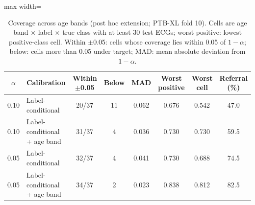\begin{table}[!htbp]
\centering\small
\caption{Coverage across age bands (post hoc extension; PTB-XL fold 10). Cells are age band $\times$ label $\times$ true class with at least 30 test ECGs; worst positive: lowest positive-class cell. Within $\pm$0.05: cells whose coverage lies within 0.05 of $1-\alpha$; below: cells more than 0.05 under target; MAD: mean absolute deviation from $1-\alpha$.}
\label{tab:age}
\setlength{\tabcolsep}{3pt}
\begin{adjustbox}{max width=\linewidth}
\begin{tabular}{clcccccc}
\toprule
$\alpha$ & Calibration & Within $\pm$0.05 & Below & MAD & Worst positive & Worst cell & Referral (\%) \\
\midrule
0.10 & Label-conditional & 20/37 & 11 & 0.062 & 0.676 & 0.542 & 47.0 \\
0.10 & Label-conditional + age band & 31/37 & 4 & 0.036 & 0.730 & 0.730 & 59.5 \\
0.05 & Label-conditional & 32/37 & 4 & 0.041 & 0.730 & 0.688 & 74.5 \\
0.05 & Label-conditional + age band & 34/37 & 2 & 0.023 & 0.838 & 0.812 & 82.5 \\
\bottomrule
\end{tabular}
\end{adjustbox}
\end{table}
